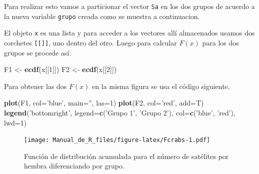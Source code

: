 \documentclass[10pt,]{krantz}
\makeatletter
\newenvironment{Shaded}{\begin{snugshade}}{\end{snugshade}}
\newcommand{\KeywordTok}[1]{\textcolor[rgb]{0.13,0.29,0.53}{\textbf{{#1}}}}
\newcommand{\DataTypeTok}[1]{\textcolor[rgb]{0.13,0.29,0.53}{{#1}}}
\newcommand{\DecValTok}[1]{\textcolor[rgb]{0.00,0.00,0.81}{{#1}}}
\newcommand{\StringTok}[1]{\textcolor[rgb]{0.31,0.60,0.02}{{#1}}}
\newcommand{\NormalTok}[1]{{#1}}
\newenvironment{kframe}{%
\medskip{}
\setlength{\fboxsep}{.8em}
 \def\at@end@of@kframe{}%
 \ifinner\ifhmode%
  \def\at@end@of@kframe{\end{minipage}}%
  \begin{minipage}{\columnwidth}%
 \fi\fi%
 \def\FrameCommand##1{\hskip\@totalleftmargin \hskip-\fboxsep
 \colorbox{shadecolor}{##1}\hskip-\fboxsep
     \hskip-\linewidth \hskip-\@totalleftmargin \hskip\columnwidth}%
 \MakeFramed {\advance\hsize-\width
   \@totalleftmargin\z@ \linewidth\hsize
   \@setminipage}}%
 {\par\unskip\endMakeFramed%
 \at@end@of@kframe}
\renewenvironment{Shaded}{\begin{kframe}}{\end{kframe}}
\makeatother
\begin{document}
Para realizar esto vamos a particionar el vector \texttt{Sa} en los dos
grupos de acuerdo a la nueva variable \texttt{grupo} creada como se
muestra a continuacion.

\begin{Shaded}
\end{Shaded}

El objeto \texttt{x} es una lista y para acceder a los vectores allí
almacenados usamos dos corchetes \texttt{{[}{[}{]}{]}}, uno dentro del
otro. Luego para calcular \(F(x)\) para los dos grupos se procede así:

\begin{Shaded}
\begin{Highlighting}[]
\NormalTok{F1 <-}\StringTok{ }\KeywordTok{ecdf}\NormalTok{(x[[}\DecValTok{1}\NormalTok{]])}
\NormalTok{F2 <-}\StringTok{ }\KeywordTok{ecdf}\NormalTok{(x[[}\DecValTok{2}\NormalTok{]])}
\end{Highlighting}
\end{Shaded}

Para obtener las dos \(F(x)\) en la misma figura se usa el código
siguiente.

\begin{Shaded}
\begin{Highlighting}[]
\KeywordTok{plot}\NormalTok{(F1, }\DataTypeTok{col=}\StringTok{'blue'}\NormalTok{, }\DataTypeTok{main=}\StringTok{''}\NormalTok{, }\DataTypeTok{las=}\DecValTok{1}\NormalTok{)}
\KeywordTok{plot}\NormalTok{(F2, }\DataTypeTok{col=}\StringTok{'red'}\NormalTok{, }\DataTypeTok{add=}\NormalTok{T)}
\KeywordTok{legend}\NormalTok{(}\StringTok{'bottomright'}\NormalTok{, }\DataTypeTok{legend=}\KeywordTok{c}\NormalTok{(}\StringTok{'Grupo 1'}\NormalTok{, }\StringTok{'Grupo 2'}\NormalTok{),}
       \DataTypeTok{col=}\KeywordTok{c}\NormalTok{(}\StringTok{'blue'}\NormalTok{, }\StringTok{'red'}\NormalTok{), }\DataTypeTok{lwd=}\DecValTok{1}\NormalTok{)}
\end{Highlighting}
\end{Shaded}

\begin{figure}[htbp]
\centering
\texttt{[image: Manual\_de\_R\_files/figure-latex/Fcrabs-1.pdf]}
\caption{\label{fig:Fcrabs}Función de distribución acumulada para el número
de satélites por hembra diferenciando por grupo.}
\end{figure}
\end{document}
